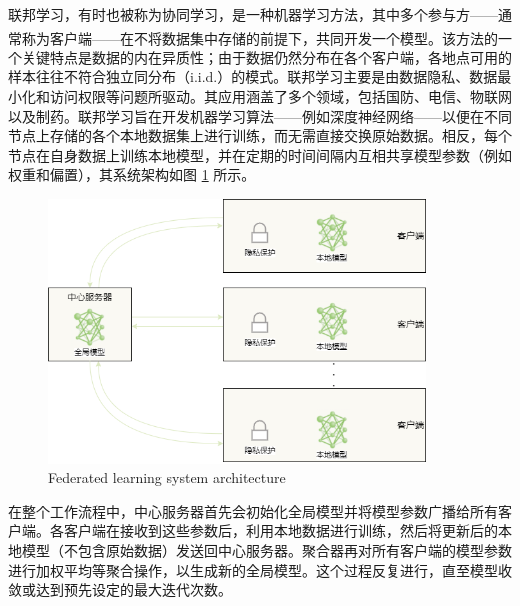 联邦学习，有时也被称为协同学习，是一种机器学习方法，其中多个参与方——通常称为客户端——在不将数据集中存储的前提下，共同开发一个模型\textsuperscript{\cite{kairouz2021advances}}。该方法的一个关键特点是数据的内在异质性；由于数据仍然分布在各个客户端，各地点可用的样本往往不符合独立同分布（i.i.d.）的模式。联邦学习主要是由数据隐私、数据最小化和访问权限等问题所驱动。其应用涵盖了多个领域，包括国防、电信、物联网以及制药。联邦学习旨在开发机器学习算法——例如深度神经网络——以便在不同节点上存储的各个本地数据集上进行训练，而无需直接交换原始数据。相反，每个节点在自身数据上训练本地模型，并在定期的时间间隔内互相共享模型参数（例如权重和偏置），其系统架构如图 \ref{FedArch} 所示。

\begin{figure}[h] %
	\centering %
	\includegraphics[width=10cm]{chapters/imgs/FedArch3} %
	{\wuhao Federated learning system architecture} %
	\label{FedArch} %
\end{figure} %

在整个工作流程中，中心服务器首先会初始化全局模型并将模型参数广播给所有客户端。各客户端在接收到这些参数后，利用本地数据进行训练，然后将更新后的本地模型（不包含原始数据）发送回中心服务器。聚合器再对所有客户端的模型参数进行加权平均等聚合操作，以生成新的全局模型。这个过程反复进行，直至模型收敛或达到预先设定的最大迭代次数。

